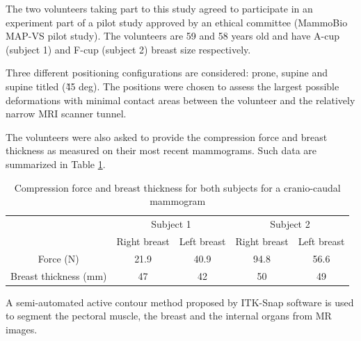 The two volunteers taking part to this study agreed to participate in an experiment part of a pilot study approved by an ethical committee (MammoBio MAP-VS pilot study). The volunteers are 59 and 58 years old and have A-cup (subject 1) and F-cup (subject 2) breast size respectively. 

Three different positioning configurations are considered: prone, supine and supine titled (\~ 45 deg). The positions were chosen to assess the largest possible deformations with minimal contact areas between the volunteer and the relatively narrow MRI scanner tunnel. 

The volunteers were also asked to provide the compression force and breast thickness as measured on their most recent mammograms. Such data are summarized in Table \ref{tab:forceandthichnessdata}.
\begin{table}[H]
\centering
\begin{tabular}{c|c|c||c|c|}
\cline{2-5}
&\multicolumn{2}{c||}{Subject 1}&\multicolumn{2}{c|}{Subject 2}\\
\cline{2-5}
& Right breast & Left breast & Right breast & Left breast\\
\cline{2-5}
\hline
\multicolumn{1}{|c||}{Force (N)}  & 21.9 &40.9 &94.8 & 56.6 \\
\hline
\multicolumn{1}{|c||}{ Breast thickness (mm)} & 47 & 42 & 50 & 49 \\
\hline

\end{tabular}
\caption{Compression force and breast thickness for both subjects for a cranio-caudal mammogram}\label{tab:forceandthichnessdata}
\end{table}



A semi-automated active contour method proposed by ITK-Snap software is used to segment the pectoral muscle, the breast and the internal organs from MR images. 

